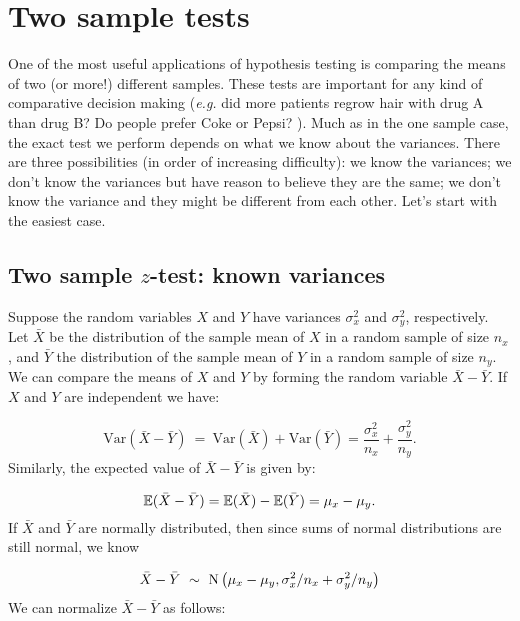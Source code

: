 \section{Two sample tests} \label{sec: Twosampletests}

One of the most useful applications of hypothesis testing is comparing the means of two (or more!) different samples.  These tests are important for any kind of comparative decision making (\emph{e.g.} did more patients regrow hair with drug A than drug B?  Do people prefer Coke or Pepsi? ).  Much as in the one sample case, the exact test we perform depends on what we know about the variances.  There are three possibilities (in order of increasing difficulty):  we know the variances; we don't know the variances but have reason to believe they are the same; we don't know the variance and they might be different from each other.  Let's start with the easiest case.


\subsection{Two sample $z$-test: known variances}

Suppose the random variables $X$ and $Y$ have variances $\sigma^2_x$ and $\sigma^2_y$, respectively.  Let $\bar{X}$ be the distribution of the sample mean of $X$ in a random sample of size $n_x$, and $\bar{Y}$ the distribution of the sample mean of $Y$ in a random sample of size $n_y$.  We can compare the means of $X$ and $Y$ by forming the random variable $\bar{X} - \bar{Y}$.  If $X$ and $Y$ are independent we have:

\begin{equation*}
\textrm{Var}(\bar{X} - \bar{Y})\ =\ \textrm{Var}(\bar{X}) + \textrm{Var}(\bar{Y}) = \frac{\sigma^2_x}{n_x} + \frac{\sigma^2_y}{n_y}.
\end{equation*}
Similarly, the expected value of $\bar{X} - \bar{Y}$ is given by:

\begin{equation*}
{\mathbb E}(\bar{X} - \bar{Y}) = {\mathbb E}(\bar{X}) - {\mathbb E}(\bar{Y}) = \mu_x - \mu_y.
\end{equation*}
If $\bar{X}$ and $\bar{Y}$ are normally distributed, then since sums of normal distributions are still normal, we know

\begin{equation*}
\bar{X} - \bar{Y}\ \sim\  {\rm N}\left(\mu_x - \mu_y, \sigma^2_x/n_x + \sigma^2_y/n_y\right)
\end{equation*}
We can normalize $\bar{X}-\bar{Y}$ as follows:

